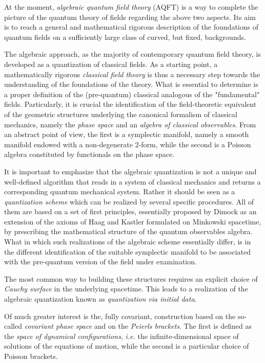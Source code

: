 \documentclass[a4paper,10pt]{amsart}
\begin{document}
At the moment, \emph{algebraic quantum field theory} (AQFT) is 
a way to complete the picture of the quantum theory of fields regarding the above two aspects.
Its aim is to reach a general and mathematical rigorous description of the foundations of quantum fields on a  sufficiently large class of curved, but fixed, backgrounds.

The algebraic approach, as the majority of contemporary quantum field theory, is developed as a quantization of classical fields.
As a starting point, a mathematically rigorous \emph{classical field theory}  is thus a necessary step towards the understanding of the foundations of  the theory.
What is essential to determine is a proper definition of the (pre-quantum) classical analogous of the "fundamental" fields.
Particularly, it is crucial the identification of the field-theoretic equivalent of the geometric structures underlying the canonical formalism of classical mechanics, namely the \emph{phase space} and an \emph{algebra of classical observables}. 
From an abstract point of view,  the first is a symplectic manifold, namely a smooth manifold endowed with a non-degenerate 2-form, while the second is a Poisson algebra constituted by functionals on the phase space.

It is important to emphasize that the algebraic quantization is not a unique and well-defined algorithm that reads in a system of classical mechanics and returns a corresponding quantum mechanical system.
Rather it should be seen as a \emph{quantization scheme} which can be realized by several specific procedures.
All of them are based on a set of first principles, essentially proposed by Dimock \cite{Dimock1980} as an extension of the axioms of Haag and Kastler formulated on Minkowski spacetime, by prescribing the mathematical structure of the quantum observables algebra.
What in which such realizations of the algebraic scheme essentially differ, is in the different identification of the suitable symplectic manifold  to be associated with the pre-quantum version of the field under examination.

The most common way to building these structures requires an explicit choice of \emph{Cauchy surface} in the underlying spacetime.     
This leads to a  realization of the algebraic quantization known as \emph{quantization via initial data}.
    
Of much greater interest is the, fully covariant, construction based on the so-called \emph{covariant phase space} and on the \emph{Peierls brackets}.
    The first is defined as the \emph{space of dynamical configurations}, \textit{i.e.}  the infinite-dimensional space of solutions of the equations of motion, while the second is a particular choice of Poisson brackets.%
        
\end{document}
